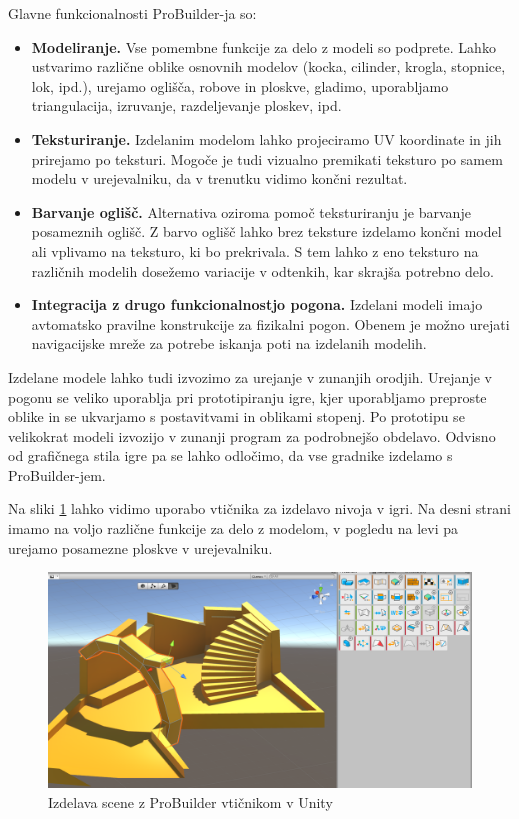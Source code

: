 \documentclass[12pt,a4paper,twoside]{book}
\begin{document}
Glavne funkcionalnosti ProBuilder-ja so:
\begin{itemize}
\item \textbf{Modeliranje.} Vse pomembne funkcije za delo z modeli so podprete. Lahko ustvarimo različne oblike osnovnih modelov (kocka, cilinder, krogla, stopnice, lok, ipd.), urejamo oglišča, robove in ploskve, gladimo, uporabljamo triangulacija, izruvanje, razdeljevanje ploskev, ipd.
\item \textbf{Teksturiranje.} Izdelanim modelom lahko projeciramo UV koordinate in jih prirejamo po teksturi. Mogoče je tudi vizualno premikati teksturo po samem modelu v urejevalniku, da v trenutku vidimo končni rezultat.
\item \textbf{Barvanje oglišč.} Alternativa oziroma pomoč teksturiranju je barvanje posameznih oglišč. Z barvo oglišč lahko brez teksture izdelamo končni model ali vplivamo na teksturo, ki bo prekrivala. S tem lahko z eno teksturo na različnih modelih dosežemo variacije v odtenkih, kar skrajša potrebno delo.
\item \textbf{Integracija z drugo funkcionalnostjo pogona.} Izdelani modeli imajo avtomatsko pravilne konstrukcije za fizikalni pogon. Obenem je možno urejati navigacijske mreže za potrebe iskanja poti na izdelanih modelih.
\end{itemize}

Izdelane modele lahko tudi izvozimo za urejanje v zunanjih orodjih. Urejanje v pogonu se veliko uporablja pri prototipiranju igre, kjer uporabljamo preproste oblike in se ukvarjamo s postavitvami in oblikami stopenj. Po prototipu se velikokrat modeli izvozijo v zunanji program za podrobnejšo obdelavo. Odvisno od grafičnega stila igre pa se lahko odločimo, da vse gradnike izdelamo s ProBuilder-jem. 

Na sliki \ref{slika:probuilder} lahko vidimo uporabo vtičnika za izdelavo nivoja v igri. Na desni strani imamo na voljo različne funkcije za delo z modelom, v pogledu na levi pa urejamo posamezne ploskve v urejevalniku.

\begin{figure}[h]
	\centering
	\includegraphics[width=15cm]{probuilder}
	\caption{Izdelava scene z ProBuilder vtičnikom v Unity}
	\label{slika:probuilder}
\end{figure}
\end{document}
